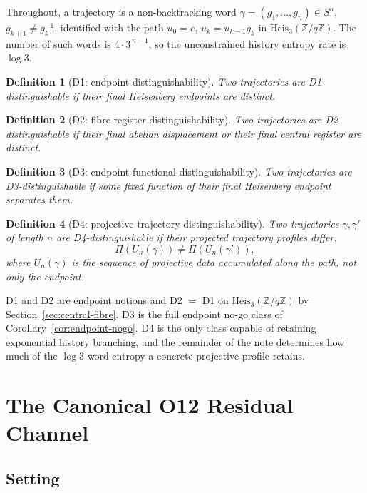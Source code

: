 \documentclass[11pt]{article}
\newtheorem{definition}{Definition}
\newcommand{\Heis}{\mathrm{Heis}_3}
\newcommand{\Zq}{\mathbb{Z}/q\mathbb{Z}}
\newcommand{\PiProj}{\Pi}
\begin{document}
Throughout, a trajectory is a non-backtracking word $\gamma=(g_1,\dots,g_n)\in S^n$, $g_{k+1}\neq g_k^{-1}$,
identified with the path $u_0=e$, $u_k=u_{k-1}g_k$ in $\Heis(\Zq)$.
The number of such words is $4\cdot 3^{\,n-1}$, so the unconstrained history entropy rate is $\log 3$.

\begin{definition}[D1: endpoint distinguishability]
\label{def:d1}
Two trajectories are D1-distinguishable if their final Heisenberg endpoints are distinct.
\end{definition}

\begin{definition}[D2: fibre-register distinguishability]
\label{def:d2}
Two trajectories are D2-distinguishable if their final abelian displacement or their final central register
are distinct.
\end{definition}

\begin{definition}[D3: endpoint-functional distinguishability]
\label{def:d3}
Two trajectories are D3-distinguishable if some fixed function of their final Heisenberg endpoint separates
them.
\end{definition}

\begin{definition}[D4: projective trajectory distinguishability]
\label{def:d4}
Two trajectories $\gamma,\gamma'$ of length $n$ are D4-distinguishable if their projected trajectory profiles
differ,
\[
\PiProj(U_n(\gamma))\neq \PiProj(U_n(\gamma')) ,
\]
where $U_n(\gamma)$ is the sequence of projective data accumulated along the path, not only the endpoint.
\end{definition}

D1 and D2 are endpoint notions and D2 $=$ D1 on $\Heis(\Zq)$ by Section~\ref{sec:central-fibre}.
D3 is the full endpoint no-go class of Corollary~\ref{cor:endpoint-nogo}.
D4 is the only class capable of retaining exponential history branching, and the remainder of the note
determines how much of the $\log 3$ word entropy a concrete projective profile retains.

\section{The Canonical O12 Residual Channel}
\label{sec:canonical-channel}

\subsection{Setting}
\label{sec:setting}
\end{document}
